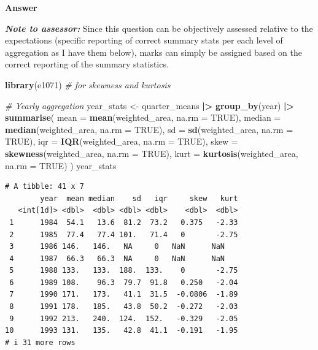 \documentclass[
  british,
  10pt,
]{article}
\newenvironment{Shaded}{\begin{snugshade}}{\end{snugshade}}
\newcommand{\AttributeTok}[1]{\textcolor[rgb]{0.13,0.29,0.53}{#1}}
\newcommand{\CommentTok}[1]{\textcolor[rgb]{0.56,0.35,0.01}{\textit{#1}}}
\newcommand{\ConstantTok}[1]{\textcolor[rgb]{0.56,0.35,0.01}{#1}}
\newcommand{\FunctionTok}[1]{\textcolor[rgb]{0.13,0.29,0.53}{\textbf{#1}}}
\newcommand{\NormalTok}[1]{#1}
\newcommand{\OtherTok}[1]{\textcolor[rgb]{0.56,0.35,0.01}{#1}}
\newcommand{\SpecialCharTok}[1]{\textcolor[rgb]{0.81,0.36,0.00}{\textbf{#1}}}
\begin{document}
\textbf{Answer}

\textbf{\emph{Note to assessor:}} Since this question can be objectively
assessed relative to the expectations (specific reporting of correct
summary stats per each level of aggregation as I have them below), marks
can simply be assigned based on the correct reporting of the summary
statistics.

\begin{Shaded}
\begin{Highlighting}[]
\FunctionTok{library}\NormalTok{(e1071)  }\CommentTok{\# for skewness and kurtosis}

\CommentTok{\# Yearly aggregation}
\NormalTok{year\_stats }\OtherTok{\textless{}{-}}\NormalTok{ quarter\_means }\SpecialCharTok{|\textgreater{}} 
  \FunctionTok{group\_by}\NormalTok{(year) }\SpecialCharTok{|\textgreater{}} 
  \FunctionTok{summarise}\NormalTok{(}
    \AttributeTok{mean =} \FunctionTok{mean}\NormalTok{(weighted\_area, }\AttributeTok{na.rm =} \ConstantTok{TRUE}\NormalTok{),}
    \AttributeTok{median =} \FunctionTok{median}\NormalTok{(weighted\_area, }\AttributeTok{na.rm =} \ConstantTok{TRUE}\NormalTok{),}
    \AttributeTok{sd =} \FunctionTok{sd}\NormalTok{(weighted\_area, }\AttributeTok{na.rm =} \ConstantTok{TRUE}\NormalTok{),}
    \AttributeTok{iqr =} \FunctionTok{IQR}\NormalTok{(weighted\_area, }\AttributeTok{na.rm =} \ConstantTok{TRUE}\NormalTok{),}
    \AttributeTok{skew =} \FunctionTok{skewness}\NormalTok{(weighted\_area, }\AttributeTok{na.rm =} \ConstantTok{TRUE}\NormalTok{),}
    \AttributeTok{kurt =} \FunctionTok{kurtosis}\NormalTok{(weighted\_area, }\AttributeTok{na.rm =} \ConstantTok{TRUE}\NormalTok{)}
\NormalTok{  )}
\NormalTok{year\_stats}
\end{Highlighting}
\end{Shaded}

\begin{verbatim}
# A tibble: 41 x 7
        year  mean median    sd   iqr     skew   kurt
   <int[1d]> <dbl>  <dbl> <dbl> <dbl>    <dbl>  <dbl>
 1      1984  54.1   13.6  81.2  73.2   0.375   -2.33
 2      1985  77.4   77.4 101.   71.4   0       -2.75
 3      1986 146.   146.   NA     0   NaN      NaN   
 4      1987  66.3   66.3  NA     0   NaN      NaN   
 5      1988 133.   133.  188.  133.    0       -2.75
 6      1989 108.    96.3  79.7  91.8   0.250   -2.04
 7      1990 171.   173.   41.1  31.5  -0.0806  -1.89
 8      1991 178.   185.   43.8  50.2  -0.272   -2.03
 9      1992 213.   240.  124.  152.   -0.329   -2.05
10      1993 131.   135.   42.8  41.1  -0.191   -1.95
# i 31 more rows
\end{verbatim}
\end{document}
